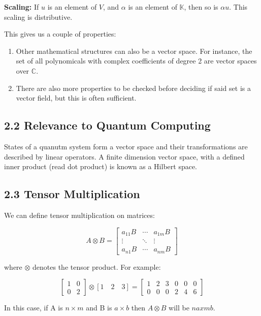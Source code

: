 \documentclass[10pt,oneside,a4paper]{article}
\begin{document}
\textbf{Scaling: } If $u$ is an element of $V$, and $\alpha$ is an element of $\mathbb{K}$, then so is $\alpha u$. This scaling is distributive. 

This gives us a couple of properties: 

\begin{enumerate} 
    \item 
    Other mathematical structures can also be a vector space. For instance, the set of all polynomicals with complex coefficients of degree 2 are vector spaces over $\mathbb{C}$. 

    \item 
    There are also more properties to be checked before deciding if said set is a vector field, but this is often sufficient. 
\end{enumerate}

\subsection*{2.2 Relevance to Quantum Computing}

States of a quanutm system form a vector space and their transformations are described by linear operators. A finite dimension vector space, with a defined inner product (read dot product) is known as a Hilbert space. 

\subsection*{2.3 Tensor Multiplication}

We can define tensor multiplication on matrices: 

\[A \otimes B = 
\begin{bmatrix}
a_{11}B & \cdots & a_{1m}B \\
\vdots & \ddots & \vdots \\
a_{n1}B & \cdots & a_{nm}B
\end{bmatrix}\]

where $\otimes$ denotes the tensor product. For example:

\[\begin{bmatrix}
1 & 0 \\
0 & 2
\end{bmatrix} \otimes [1 \quad 2 \quad 3] = 
\begin{bmatrix}
1 & 2 & 3 & 0 & 0 & 0 \\
0 & 0 & 0 & 2 & 4 & 6
\end{bmatrix}\]

In this case, if A is $ n \times m $ and B is $ a \times b$ then $A \otimes B$ will be $na x mb$. 
\end{document}
